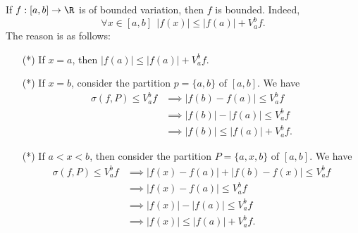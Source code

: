 \begin{remark}
    If \( f: [a,b] \to \R  \) is of bounded variation, then \( f  \) is bounded. Indeed,  
    \[  \forall x \in [a,b] \ \ | f(x) |  \leq | f(a) |  + {V}_{a}^{b} f. \]
    The reason is as follows:
    \begin{enumerate}
        \item[(*)] If \( x = a  \), then \( | f(a) |  \leq | f(a) |  + {V}_{a}^{b} f  \).
        \item[(*)] If \( x = b  \), consider the partition \( p = \{  a, b  \}  \) of \( [a,b] \). We have 
            \begin{align*}
                \sigma(f,P) \leq {V}_{a}^{b} f &\implies | f(b) - f(a) |  \leq {V}_{a}^{b} f \\
                                               &\implies | f(b) |  - | f(a) |  \leq {V}_{a}^{b} f \\
                                               &\implies | f(b) |  \leq | f(a) |  + {V}_{a}^{b} f.
            \end{align*}
        \item[(*)] If \( a < x < b  \), then consider the partition \( P = \{  a,x,b \}  \) of \( [a,b] \). We have  
            \begin{align*}
                \sigma(f,P) \leq {V}_{a}^{b} f &\implies | f(x) - f(a) |  + | f(b) - f(x) |  \leq {V}_{a}^{b} f  \\
                                               &\implies | f(x) - f(a) |  \leq {V}_{a}^{b} f \\
                                               &\implies | f(x) |  - | f(a) |  \leq {V}_{a}^{b} f \\
                                               &\implies | f(x) |  \leq | f(a) |  + {V}_{a}^{b} f. 
            \end{align*}
    \end{enumerate}
\end{remark}

